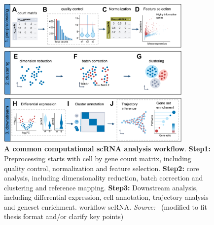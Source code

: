 \begin{figure}[!ht]
	\centering
	\includegraphics[width=0.85\textwidth]{workflow_scRNA/fig}
	\vspace{0.1cm}
	\caption[A common computational scRNA analysis workflow]{
		\textbf{A common computational scRNA analysis workflow}.
		\textbf{Step1:} Preprocessing starts with cell by gene count matrix, including quality control, normalization and feature selection.
		\textbf{Step2:} core analysis, including dimensionality reduction, batch correction and clustering and reference mapping.
		\textbf{Step3:} Downstream analysis, including differential expression, cell annotation, trajectory analysis and geneset enrichment.
	workflow scRNA. \emph{Source:~\cite{heumos2023best}} (modified to fit thesis format and/or clarify key points)}
	\label{fig:workflow_scRNA}
\end{figure}

